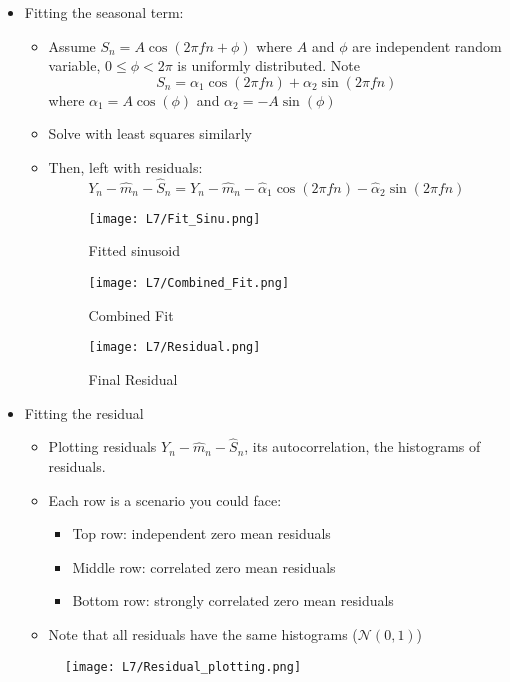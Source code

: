 \documentclass[12pt]{article}
\begin{document}
\begin{itemize}
\begin{itemize}
\end{itemize}
\item Fitting the seasonal term:
\begin{itemize}
    \item Assume $S_n = A\cos(2\pi fn + \phi)$ where $A$ and $\phi$ are independent random variable, $0\le \phi < 2\pi$ is uniformly distributed. Note 
    \[
    S_n = \alpha_1\cos(2\pi fn) + \alpha_2\sin(2\pi fn)
    \]
    where $\alpha_1 = A\cos(\phi)$ and $\alpha_2 = -A\sin(\phi)$
    \item Solve with least squares similarly
    \item Then, left with residuals:
    \[
    Y_n - \hat{m}_n - \hat{S}_n = Y_n - \hat{m}_n - \hat{\alpha}_1\cos(2\pi fn) - \hat{\alpha}_2\sin(2\pi fn)
    \]
    \begin{figure}[H]
    \centering
    \texttt{[image: L7/Fit\_Sinu.png]}
    \caption{Fitted sinusoid}
    \end{figure}
    
    \begin{figure}[H]
    \centering
    \texttt{[image: L7/Combined\_Fit.png]}
    \caption{Combined Fit}
    \end{figure}
    
    \begin{figure}[H]
    \centering
    \texttt{[image: L7/Residual.png]}
    \caption{Final Residual}
    \end{figure}
    
\end{itemize}
\item Fitting the residual
\begin{itemize}
    \item Plotting residuals $Y_n -\hat{m}_n - \hat{S}_n $, its autocorrelation, the histograms of residuals.
    \item Each row is a scenario you could face:
    \begin{itemize}
        \item Top row: independent zero mean residuals
        \item Middle row: correlated zero mean residuals
        \item Bottom row: strongly correlated zero mean residuals
    \end{itemize}
    \item Note that all residuals have the same histograms ($\mathcal{N}(0,1)$)
\end{itemize}
\begin{figure}[H]
    \centering
    \texttt{[image: L7/Residual\_plotting.png]}
    \end{figure}
\end{itemize}
\end{document}
